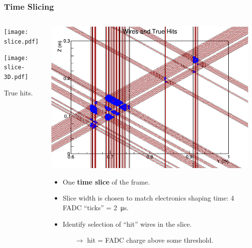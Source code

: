 \documentclass[xcolor=dvipsnames]{beamer}
\begin{document}
\begin{frame}[fragile]
  \frametitle{Time Slicing}
  
  \begin{columns}
    \begin{column}{0.35\textwidth}
      \begin{center}
        \vspace{-.5cm}

        \texttt{[image: slice.pdf]}

        \vspace{-2cm}

        \texttt{[image: slice-3D.pdf]}

        \scriptsize True hits.
      \end{center}
    \end{column}
    \begin{column}{0.6\textwidth}

      \includegraphics[width=\textwidth]{wires-and-true-hits.png}

      \begin{itemize} \scriptsize
      \item One \textbf{time slice} of the frame.
      \item Slice width is chosen to match electronics shaping time: 4
        FADC ``ticks'' = \SI{2}{\micro\second}.
      \item Identify selection of ``hit'' wires in the slice.
        \begin{itemize} \scriptsize
        \item[$\rightarrow$] hit = FADC charge above some threshold.
        \end{itemize}
      \end{itemize}
    \end{column}
  \end{columns}

\end{frame}
\end{document}
